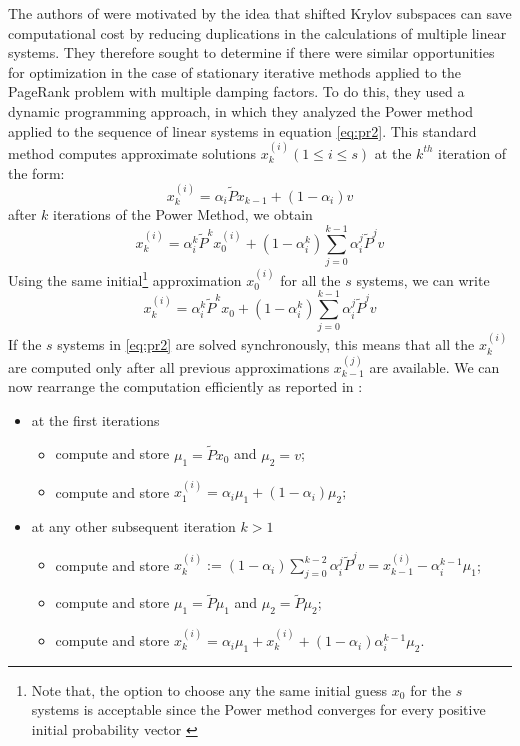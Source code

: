 The authors of \cite{SHEN2022126799} were motivated by the idea that shifted Krylov subspaces can save computational cost by reducing duplications in the calculations of multiple linear systems. They therefore sought to determine if there were similar opportunities for optimization in the case of stationary iterative methods applied to the PageRank problem with multiple damping factors. To do this, they used a dynamic programming approach, in which they analyzed the Power method applied to the sequence of linear systems in equation \ref{eq:pr2}. This standard method computes approximate solutions $x_k^{(i)} (1 \leq i \leq s)$ at the $k^{th}$ iteration of the form:
\begin{equation}
    x_k^{(i)} = \alpha_i \tilde P x_{k-1} + (1 - \alpha_i)v
\end{equation}
after $k$ iterations of the Power Method, we obtain
\begin{equation}
    x_k^{(i)} = \alpha_i^k \tilde P^k x_0^{(i)} + (1 - \alpha_i^k) \sum_{j=0}^{k-1} \alpha_i^j \tilde P^j v
\end{equation}
Using the same initial\footnote{Note that, the option to choose any the same initial guess $x_0$ for the $s$ systems is acceptable since the Power method converges for every positive initial probability vector \cite{SHEN2022126799}} approximation $x_0^{(i)}$ for all the $s$ systems, we can write
\begin{equation}\label{eq:pw-it}
    x_k^{(i)} = \alpha_i^k \tilde P^k x_0 + (1 - \alpha_i^k) \sum_{j=0}^{k-1} \alpha_i^j \tilde P^j v
\end{equation}
If the $s$ systems in \ref{eq:pr2} are solved synchronously, this means that all the $x^{(i)}_k$ are computed only after all previous approximations $x^{(j)}_{k-1}$ are available. We can now rearrange the computation efficiently as reported in \cite{SHEN2022126799}:
\begin{itemize}
    \item at the first iterations
        \begin{itemize}
            \item compute and store $\mu_1 = \tilde P x_0$ and $\mu_2 = v$;
            \item compute and store $x_1^{(i)} = \alpha_i \mu_1 + (1-\alpha_i)\mu_2;$
        \end{itemize}
    \item at any other subsequent iteration $k>1$
        \begin{itemize}
            \item compute and store $ x_k^{(i)} := (1-\alpha_i)\sum_{j=0}^{k-2} \alpha_i^j \tilde P^j v= x_{k-1}^{(i)} - \alpha_i^{k-1} \mu_1$;
            \item compute and store $\mu_1 = \tilde P \mu_1$ and $\mu_2 = \tilde P \mu_2$;
            \item compute and store $x_k^{(i)} = \alpha_i \mu_1 + x_k^{(i)} + (1-\alpha_i)\alpha^{k-1}_i \mu_2$.
        \end{itemize}
\end{itemize}
